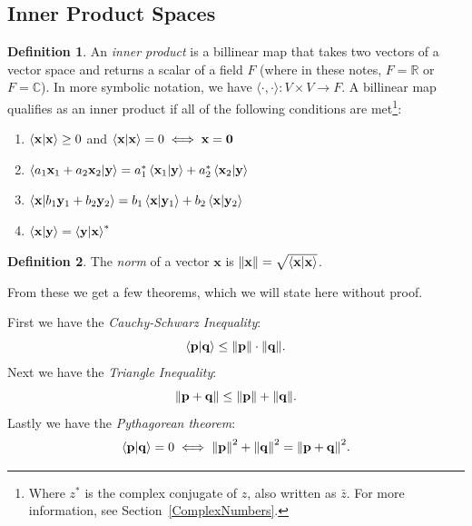\documentclass[10pt]{scrartcl}
\numberwithin{equation}{subsection}
\theoremstyle{definition}
\newtheorem{definition}{Definition}[section]
\theoremstyle{remark}
\newenvironment{definitionSR}
{
\begin{siderules}
\begin{definition}
}
{
\end{definition}
\end{siderules}
}
\newcommand{\Reals}{\mathbb{R}}
\newcommand{\Complex}{\mathbb{C}}
\newcommand{\ve}[1]{
	\mathbf{#1}
}
\begin{document}
\subsection{Inner Product Spaces}

\begin{definitionSR}
An \textit{inner product} is a billinear map that takes two vectors of a vector
space and returns a scalar of a field $F$ (where in these notes, $F=\Reals$ or
$F=\Complex$).
In more symbolic notation, we have $\langle \cdot , \cdot \rangle : V \times V
\to F$. A billinear map qualifies as an inner product if all of the following
conditions are
met\footnote{Where $z^*$ is the complex conjugate of $z$, also written as
$\bar{z}$. For more information, see Section~\ref{ComplexNumbers}.}:
\begin{enumerate}
\item $\braket{\ve{x}}{\ve{x}} \geq 0$ and $\braket{\ve{x}}{\ve{x}} = 0 \iff \ve{x} = \ve{0}$
\item $\braket{a_1\ve{x}_1 + a_2\ve{x}_2}{\ve{y}} = a_1^*\braket{\ve{x}_1}{\ve{y}} + a_2^*\braket{\ve{x}_2}{\ve{y}}$
\item $\braket{\ve{x}}{b_1\ve{y}_1 + b_2\ve{y}_2} = b_1\braket{\ve{x}}{\ve{y}_1} + b_2\braket{\ve{x}}{\ve{y}_2}$
\item $\braket{\ve{x}}{\ve{y}} = \braket{\ve{y}}{\ve{x}}^*$
\end{enumerate}

\end{definitionSR}
\begin{definitionSR}
The \textit{norm} of a vector $\ve{x}$ is $\norm{\ve{x}} = \sqrt{\braket{\ve{x}}{\ve{x}}}$.
\end{definitionSR}

From these we get a few theorems, which we will state here without proof.

First we have the \textit{Cauchy-Schwarz Inequality}:
\begin{equation}
\braket{\ve{p}}{\ve{q}} \leq \norm{\ve{p}}\cdot\norm{\ve{q}}.
\end{equation}
Next we have the \textit{Triangle Inequality}:
\begin{equation}
\norm{\ve{p} + \ve{q}} \leq \norm{\ve{p}} + \norm{\ve{q}}.
\end{equation}
Lastly we have the \textit{Pythagorean theorem}:
\begin{equation}
\braket{\ve{p}}{\ve{q}} = 0 \iff \norm{\ve{p}}^2 + \norm{\ve{q}}^2 =
\norm{\ve{p} + \ve{q}}^2.
\end{equation}
\end{document}
